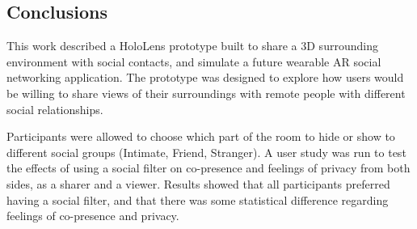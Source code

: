 \subsection{Conclusions}

This work described a HoloLens prototype built to share a 3D surrounding environment with social contacts, and simulate a future wearable AR social networking application. The prototype was designed to explore how users would be willing to share views of their surroundings with remote people with different social relationships. 

Participants were allowed to choose which part of the room to hide or show to different social groups (Intimate, Friend, Stranger). A user study was run to test the effects of using a social filter on co-presence and feelings of privacy from both sides, as a sharer and a viewer. Results showed that all participants preferred having a social filter, and that there was some statistical difference regarding feelings of co-presence and privacy. 

